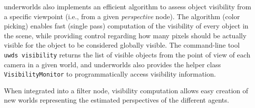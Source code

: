 \documentclass[letterpaper, 10pt, conference]{ieeeconf}
\newcommand{\ie}{i.e.,\xspace}
\newcommand{\uwds}{{\sc underworlds}\xspace}
\begin{document}
\uwds also implements an efficient algorithm to assess object visibility from a
specific viewpoint (\ie from a given \emph{perspective} node). The algorithm (color
picking) enables fast (single pass) computation of the visibility of every
object in the scene, while providing control regarding how many pixels should be actually
visible for the object to be considered globally visible. The
command-line tool {\tt uwds visibility} returns the list of visible objects from
the point of view of each camera in a given world, and \uwds also provides the
helper class {\tt VisibilityMonitor} to programmatically access visibility
information.

When integrated into a filter node, visibility computation allows easy
creation of new worlds representing the estimated perspectives of the different
agents.

%
%
%
%
%
%
%
%
%
%
%
%
%
%
%
%
\end{document}
